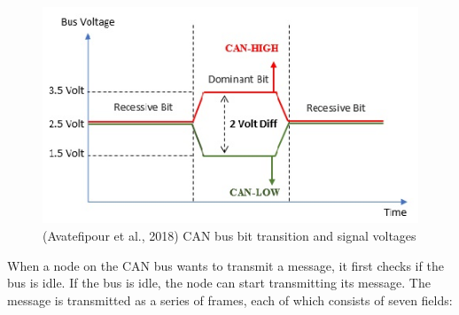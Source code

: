 \documentclass[12pt]{article}
\begin{document}
 \begin{figure}[!h]
    \centering
    \includegraphics[width=\textwidth]{images/02-2023/CAN Differential signal.jpg}
    \caption{(Avatefipour et al., 2018) CAN bus bit transition and signal voltages}  
    \label{fig:can_specification}
\end{figure}
 When a node on the CAN bus wants to transmit a message, it first checks if the bus is idle. 
 If the bus is idle, the node can start transmitting its message. 
 The message is transmitted as a series of frames, each of which consists of seven fields:
\end{document}
